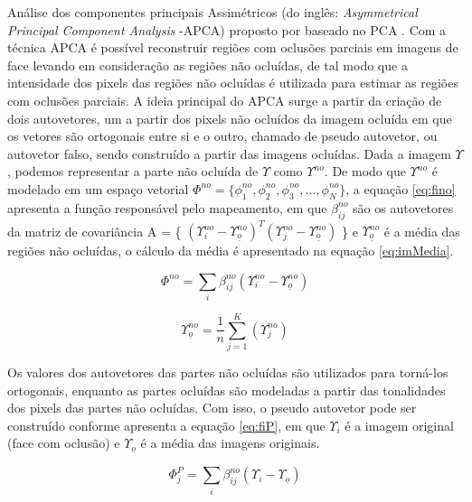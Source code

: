  Análise dos componentes principais Assimétricos (do inglês: \textit{Asymmetrical Principal Component Analysis} -APCA)  proposto por  baseado no PCA . Com a técnica APCA é possível reconstruir regiões com oclusões parciais em imagens de face levando em consideração as regiões não ocluídas, de tal modo que a intensidade dos pixels das regiões não ocluídas é utilizada para estimar as regiões com oclusões parciais. A ideia principal do APCA surge a partir da criação de dois autovetores, um a partir dos pixels não ocluídos da imagem ocluída em que os vetores são ortogonais entre si e o outro, chamado de pseudo autovetor, ou autovetor falso, sendo construído a partir das imagens ocluídas. Dada a imagem $\Upsilon$, podemos representar a parte não ocluída de $\Upsilon$ como $\Upsilon^{no}$. De modo que $\Upsilon^{no}$ é modelado em um espaço vetorial $\Phi^{no} = \{ \phi _1^{no}, \phi _2^{no}, \phi _3^{no},...,\phi _N^{no} \}$, a equação \ref{eq:fino} apresenta a função responsável pelo mapeamento, em que $\beta_{ij}^{no}$ são os autovetores da matriz de covariância  A = \{ $(\Upsilon_i^{no} - \Upsilon _{\underline{o}}^{no})^T (\Upsilon_j^{no} - \Upsilon _{\underline{o}}^{no})  $ \} e $\Upsilon _{\underline{o}}^{no}$ é a média das regiões não ocluídas, o cálculo da média é apresentado na equação \ref{eq:imMedia}.

\begin{equation}
 \Phi^{no} = \sum_{i}\beta_{ij}^{no}(\Upsilon_{i}^{no} - \Upsilon_{\underline{o}}^{no}) 
\label{eq:fino}
\end{equation}

\begin{equation}
\Upsilon _{\underline{o}}^{no} = \frac{1}{n} \sum _{j=1}^{K} (\Upsilon_j^{no})
\label{eq:imMedia}
\end{equation}

Os valores dos autovetores das partes não ocluídas são utilizados para torná-los ortogonais, enquanto as partes ocluídas são modeladas a partir das tonalidades dos pixels das partes não ocluídas. Com isso, o pseudo autovetor pode ser construído conforme apresenta a equação \ref{eq:fiP}, em que $\Upsilon_i$ é a imagem original (face com oclusão) e $\Upsilon_{\underline{o}}$ é a média das imagens originais.

\begin{equation}
 \Phi_j^{P} = \sum_{i}\beta_{ij}^{no}(\Upsilon_{i} - \Upsilon_{\underline{o}}) 
\label{eq:fiP}
\end{equation}

